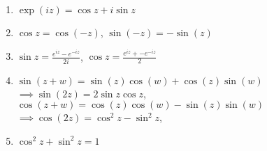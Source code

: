  {
    \begin{enumerate}[label=(\arabic*)]
        \item $\exp(iz)=\cos z+i\sin z$
        \item $\cos z = \cos(-z)$, $\sin(-z) = - \sin(z)$
        \item $\sin z = \frac{e^{iz}-e^{-iz}}{2i}$, $\cos z = \frac{e^{iz}+-e^{-iz}}{2}$
        \item $\sin(z + w) = \sin(z) \cos(w) + \cos(z) \sin(w)$\\
              $\implies \sin(2z)=2\sin z\cos z$,\\
              $\cos(z + w) = \cos(z) \cos(w) - \sin(z) \sin(w)$\\
              $\implies \cos(2z)=\cos^2z-\sin^2z$,
        \item $\cos^2z+\sin^2z=1$
    \end{enumerate}
}